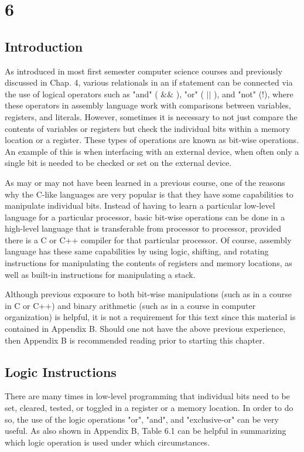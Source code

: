\documentclass[10pt]{article}
\begin{document}
\section*{6}
\subsection*{Introduction}
As introduced in most first semester computer science courses and previously discussed in Chap. 4, various relationals in an if statement can be connected via the use of logical operators such as "and" ( $\& \&$ ), "or" ( $|\mid$ ), and "not" (!), where these operators in assembly language work with comparisons between variables, registers, and literals. However, sometimes it is necessary to not just compare the contents of variables or registers but check the individual bits within a memory location or a register. These types of operations are known as bit-wise operations. An example of this is when interfacing with an external device, when often only a single bit is needed to be checked or set on the external device.

As may or may not have been learned in a previous course, one of the reasons why the C-like languages are very popular is that they have some capabilities to manipulate individual bits. Instead of having to learn a particular low-level language for a particular processor, basic bit-wise operations can be done in a high-level language that is transferable from processor to processor, provided there is a C or C++ compiler for that particular processor. Of course, assembly language has these same capabilities by using logic, shifting, and rotating instructions for manipulating the contents of registers and memory locations, as well as built-in instructions for manipulating a stack.

Although previous exposure to both bit-wise manipulations (such as in a course in C or C++) and binary arithmetic (such as in a course in computer organization) is helpful, it is not a requirement for this text since this material is contained in Appendix B. Should one not have the above previous experience, then Appendix B is recommended reading prior to starting this chapter.

\subsection*{Logic Instructions}
There are many times in low-level programming that individual bits need to be set, cleared, tested, or toggled in a register or a memory location. In order to do so, the use of the logic operations "or", "and", and "exclusive-or" can be very useful. As also shown in Appendix B, Table 6.1 can be helpful in summarizing which logic operation is used under which circumstances.
\end{document}
